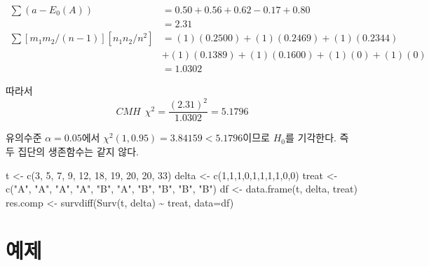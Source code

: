 \documentclass[
]{book}
\newenvironment{Shaded}{\begin{snugshade}}{\end{snugshade}}
\newcommand{\AttributeTok}[1]{\textcolor[rgb]{0.77,0.63,0.00}{#1}}
\newcommand{\DecValTok}[1]{\textcolor[rgb]{0.00,0.00,0.81}{#1}}
\newcommand{\FunctionTok}[1]{\textcolor[rgb]{0.00,0.00,0.00}{#1}}
\newcommand{\NormalTok}[1]{#1}
\newcommand{\OtherTok}[1]{\textcolor[rgb]{0.56,0.35,0.01}{#1}}
\newcommand{\SpecialCharTok}[1]{\textcolor[rgb]{0.00,0.00,0.00}{#1}}
\newcommand{\StringTok}[1]{\textcolor[rgb]{0.31,0.60,0.02}{#1}}
\theoremstyle{definition}
\theoremstyle{definition}
\theoremstyle{definition}
\theoremstyle{definition}
\theoremstyle{remark}
\begin{document}
\begin{align*}
\sum (a-E_0(A)) & = 0.50 + 0.56 + 0.62 -0.17 + 0.80 \\
& = 2.31 \\
 \sum [m_1 m_2/(n-1)][n_1 n_2 /n^2] & = (1)(0.2500) + (1)(0.2469) + (1)(0.2344)  \\
 &+ (1)(0.1389) + (1)(0.1600) + (1)(0) + (1)(0) \\
 & = 1.0302
\end{align*}

따라서
\[ CMH ~~\chi^2 = \frac{(2.31)^2} {1.0302}  = 5.1796   \]

유의수준 \(\alpha=0.05\)에서 \(\chi^2(1,0.95) = 3.84159 <5.1796\)이므로 \(H_0\)를 기각한다. 즉 두 집단의 생존함수는 같지 않다.

\begin{Shaded}
\begin{Highlighting}[]
\NormalTok{t }\OtherTok{\textless{}{-}} \FunctionTok{c}\NormalTok{(}\DecValTok{3}\NormalTok{, }\DecValTok{5}\NormalTok{, }\DecValTok{7}\NormalTok{, }\DecValTok{9}\NormalTok{, }\DecValTok{12}\NormalTok{,  }\DecValTok{18}\NormalTok{,   }\DecValTok{19}\NormalTok{,  }\DecValTok{20}\NormalTok{,  }\DecValTok{20}\NormalTok{,  }\DecValTok{33}\NormalTok{)}
\NormalTok{delta }\OtherTok{\textless{}{-}} \FunctionTok{c}\NormalTok{(}\DecValTok{1}\NormalTok{,}\DecValTok{1}\NormalTok{,}\DecValTok{1}\NormalTok{,}\DecValTok{0}\NormalTok{,}\DecValTok{1}\NormalTok{,}\DecValTok{1}\NormalTok{,}\DecValTok{1}\NormalTok{,}\DecValTok{1}\NormalTok{,}\DecValTok{0}\NormalTok{,}\DecValTok{0}\NormalTok{)}
\NormalTok{treat }\OtherTok{\textless{}{-}} \FunctionTok{c}\NormalTok{(}\StringTok{"A"}\NormalTok{, }\StringTok{"A"}\NormalTok{, }\StringTok{"A"}\NormalTok{, }\StringTok{"A"}\NormalTok{, }\StringTok{"B"}\NormalTok{, }\StringTok{"A"}\NormalTok{, }\StringTok{"B"}\NormalTok{, }\StringTok{"B"}\NormalTok{, }\StringTok{"B"}\NormalTok{, }\StringTok{"B"}\NormalTok{)}
\NormalTok{df }\OtherTok{\textless{}{-}} \FunctionTok{data.frame}\NormalTok{(t, delta, treat)}
\NormalTok{res.comp }\OtherTok{\textless{}{-}} \FunctionTok{survdiff}\NormalTok{(}\FunctionTok{Surv}\NormalTok{(t, delta) }\SpecialCharTok{\textasciitilde{}}\NormalTok{ treat, }\AttributeTok{data=}\NormalTok{df)}
\end{Highlighting}
\end{Shaded}

\hypertarget{uxc608uxc81c-1}{%
\section{예제}\label{uxc608uxc81c-1}}
\end{document}
